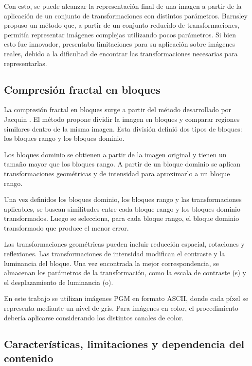 \documentclass[a4paper]{llncs}
\begin{document}
Con esto, se puede alcanzar la representación final de una imagen a partir de la aplicación de un conjunto de transformaciones con distintos parámetros. Barnsley propuso un método que, a partir de un conjunto reducido de transformaciones, permitía representar imágenes complejas utilizando pocos parámetros. Si bien esto fue innovador, presentaba limitaciones para su aplicación sobre imágenes reales, debido a la dificultad de encontrar las transformaciones necesarias para representarlas.

\subsection{Compresión fractal en bloques}

La compresión fractal en bloques surge a partir del método desarrollado por Jacquin \cite{jacquin1992}. El método propone dividir la imagen en bloques y comparar regiones similares dentro de la misma imagen. Esta división definió dos tipos de bloques: los bloques rango y los bloques dominio.

Los bloques dominio se obtienen a partir de la imagen original y tienen un tamaño mayor que los bloques rango. A partir de un bloque dominio se aplican transformaciones geométricas y de intensidad para aproximarlo a un bloque rango.

Una vez definidos los bloques dominio, los bloques rango y las transformaciones aplicables, se buscan similitudes entre cada bloque rango y los bloques dominio transformados. Luego se selecciona, para cada bloque rango, el bloque dominio transformado que produce el menor error.

Las transformaciones geométricas pueden incluir reducción espacial, rotaciones y reflexiones. Las transformaciones de intensidad modifican el contraste y la luminancia del bloque. Una vez encontrada la mejor correspondencia, se almacenan los parámetros de la transformación, como la escala de contraste (s) y el desplazamiento de luminancia (o).

En este trabajo se utilizan imágenes PGM en formato ASCII, donde cada píxel se representa mediante un nivel de gris. Para imágenes en color, el procedimiento debería aplicarse considerando los distintos canales de color.

\subsection{Características, limitaciones y dependencia del contenido}
\end{document}
